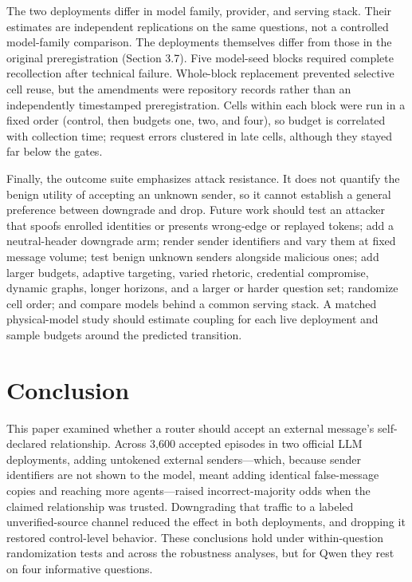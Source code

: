 \documentclass[11pt]{article}
\begin{document}
The two deployments differ in model family, provider, and serving stack. Their estimates are independent replications on the same questions, not a controlled model-family comparison. The deployments themselves differ from those in the original preregistration (Section 3.7). Five model-seed blocks required complete recollection after technical failure. Whole-block replacement prevented selective cell reuse, but the amendments were repository records rather than an independently timestamped preregistration. Cells within each block were run in a fixed order (control, then budgets one, two, and four), so budget is correlated with collection time; request errors clustered in late cells, although they stayed far below the gates.

Finally, the outcome suite emphasizes attack resistance. It does not quantify the benign utility of accepting an unknown sender, so it cannot establish a general preference between downgrade and drop. Future work should test an attacker that spoofs enrolled identities or presents wrong-edge or replayed tokens; add a neutral-header downgrade arm; render sender identifiers and vary them at fixed message volume; test benign unknown senders alongside malicious ones; add larger budgets, adaptive targeting, varied rhetoric, credential compromise, dynamic graphs, longer horizons, and a larger or harder question set; randomize cell order; and compare models behind a common serving stack. A matched physical-model study should estimate coupling for each live deployment and sample budgets around the predicted transition.

\section{Conclusion}

This paper examined whether a router should accept an external message's self-declared relationship. Across 3,600 accepted episodes in two official LLM deployments, adding untokened external senders—which, because sender identifiers are not shown to the model, meant adding identical false-message copies and reaching more agents—raised incorrect-majority odds when the claimed relationship was trusted. Downgrading that traffic to a labeled unverified-source channel reduced the effect in both deployments, and dropping it restored control-level behavior. These conclusions hold under within-question randomization tests and across the robustness analyses, but for Qwen they rest on four informative questions.
\end{document}
